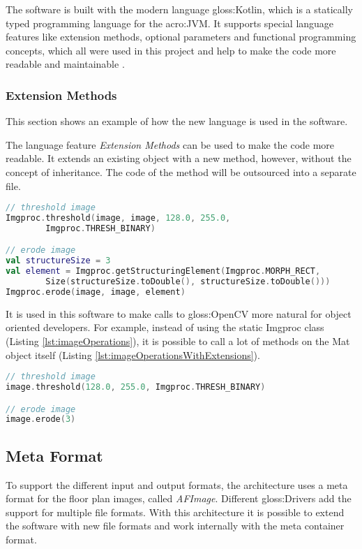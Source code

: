 The software is built with the modern language \gls{gloss:Kotlin}, which is a statically typed programming language for the \acrfull{acro:JVM}. It supports special language features like extension methods, optional parameters and functional programming concepts, which all were used in this project and help to make the code more readable and maintainable \citep{kotlin}.

\subsubsection{Extension Methods}
This section shows an example of how the new language is used in the software.

The language feature \textit{Extension Methods} can be used to make the code more readable. It extends an existing object with a new method, however, without the concept of inheritance. The code of the method will be outsourced into a separate file.

\begin{lstlisting}[caption={Erode image without extension methods},label={lst:imageOperations},language=Kotlin]
// threshold image
Imgproc.threshold(image, image, 128.0, 255.0, 
		Imgproc.THRESH_BINARY)

// erode image
val structureSize = 3
val element = Imgproc.getStructuringElement(Imgproc.MORPH_RECT, 
        Size(structureSize.toDouble(), structureSize.toDouble()))
Imgproc.erode(image, image, element)
\end{lstlisting}

It is used in this software to make calls to \gls{gloss:OpenCV} more natural for object oriented developers. For example, instead of using the static Imgproc class (Listing \ref{lst:imageOperations}), it is possible to call a lot of methods on the Mat object itself (Listing \ref{lst:imageOperationsWithExtensions}).

\begin{lstlisting}[caption={Erode image with extension methods},label={lst:imageOperationsWithExtensions},language=Kotlin]
// threshold image
image.threshold(128.0, 255.0, Imgproc.THRESH_BINARY)

// erode image
image.erode(3)
\end{lstlisting}

\pagebreak

\subsection{Meta Format}
\label{sub:MetaFormat}
To support the different input and output formats, the architecture uses a meta format for the
floor plan images, called \textit{AFImage}. Different \gls{gloss:Drivers} add the support for multiple file formats. With this architecture it is possible to extend the software with new file formats and work internally with the meta container format.

